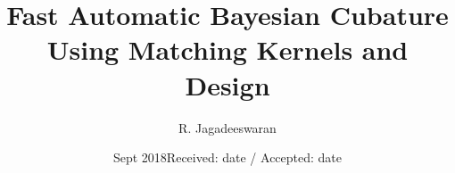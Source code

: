 \documentclass{iitthesis}          %
\begin{document}
\setlength\abovedisplayskip{0pt}
\setlength{\belowdisplayskip}{0pt}

\title{Fast Automatic Bayesian Cubature Using Matching Kernels and Design
}
%



\author{R. Jagadeeswaran       %
}
\date{Sept 2018}



\date{Received: date / Accepted: date}

\maketitle


\prelimpages         %
\end{document}
